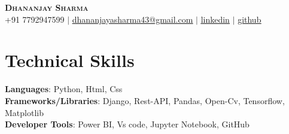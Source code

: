 \documentclass[letterpaper,11pt]{article}
\begin{document}












\begin{center}
    \textbf{\Huge \scshape Dhananjay Sharma} \\ \vspace{1pt}
    \small +91 7792947599 $|$ \href{dhananjayasharma43@gmail.com}{\underline{dhananjayasharma43@gmail.com}} $|$ 
    \href{ https://www.linkedin.com/in/dhananjay-sharma-data-science/
}{\underline{linkedin}} $|$
    \href{https://github.com/store-future}{\underline{github}}
\end{center}


















\section{Technical Skills}
 \begin{itemize}[leftmargin=0.15in, label={}]
    \small{\item
        {
         \textbf{Languages}{:  Python, Html, Css} \\
         \textbf{Frameworks/Libraries}{:  Django, Rest-API, Pandas, Open-Cv, Tensorflow, Matplotlib} \\
         \textbf{Developer Tools}{: Power BI, Vs code, Jupyter Notebook, GitHub} \\
        }
    }
 \end{itemize}
\end{document}
